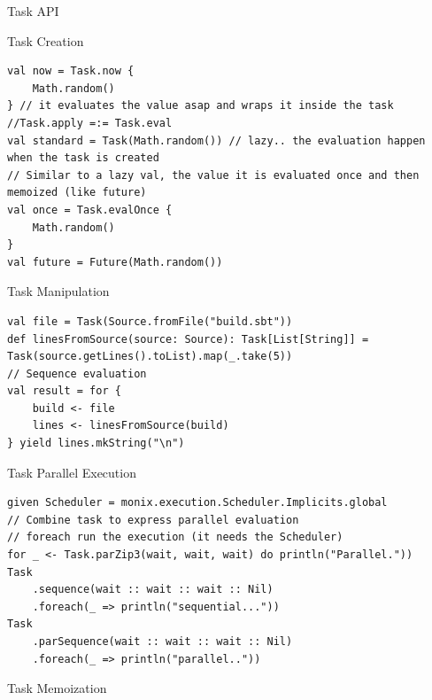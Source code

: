 \documentclass[presentation, 9pt]{beamer}\mode<presentation>{\usetheme{AMSBolognaFC}}
\begin{document}
\begin{frame}{Task API}
	\begin{alertblock}{Task Creation}
		\begin{tcolorbox}[left=0pt, top=0pt, bottom=0pt]
					 \begin{verbatim}
val now = Task.now {
	Math.random()
} // it evaluates the value asap and wraps it inside the task
//Task.apply =:= Task.eval
val standard = Task(Math.random()) // lazy.. the evaluation happen when the task is created
// Similar to a lazy val, the value it is evaluated once and then memoized (like future)
val once = Task.evalOnce {
	Math.random()
}
val future = Future(Math.random())
					 \end{verbatim}
				 \end{tcolorbox}
		 \end{alertblock}
		 \begin{alertblock}{Task Manipulation}
			\begin{tcolorbox}[left=0pt, top=0pt, bottom=0pt]
						 \begin{verbatim}
val file = Task(Source.fromFile("build.sbt"))
def linesFromSource(source: Source): Task[List[String]] = Task(source.getLines().toList).map(_.take(5))
// Sequence evaluation
val result = for {
	build <- file
	lines <- linesFromSource(build)
} yield lines.mkString("\n")
						 \end{verbatim}
					 \end{tcolorbox}
			 \end{alertblock}
			 \begin{alertblock}{Task Parallel Execution}
				\begin{tcolorbox}[left=0pt, top=0pt, bottom=0pt]
							 \begin{verbatim}
given Scheduler = monix.execution.Scheduler.Implicits.global
// Combine task to express parallel evaluation
// foreach run the execution (it needs the Scheduler)
for _ <- Task.parZip3(wait, wait, wait) do println("Parallel."))
Task
	.sequence(wait :: wait :: wait :: Nil)
	.foreach(_ => println("sequential..."))
Task
	.parSequence(wait :: wait :: wait :: Nil)
	.foreach(_ => println("parallel.."))
							 \end{verbatim}
						 \end{tcolorbox}
				 \end{alertblock}
				 \begin{alertblock}{Task Memoization}
					\begin{tcolorbox}[left=0pt, top=0pt, bottom=0pt]
								 \begin{verbatim}

\end{verbatim}
\end{tcolorbox}
\end{alertblock}
\end{frame}
\end{document}
